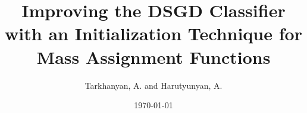 \documentclass[aspectratio=169]{beamer}
\title{Improving the DSGD Classifier with an Initialization Technique for Mass Assignment Functions}
\author{Tarkhanyan, A. and Harutyunyan, A.}
\date{\today}
\begin{document}
\begin{frame}
  \titlepage
\end{frame}

\begin{frame}
{\small\tableofcontents}
\end{frame}


\end{document}

